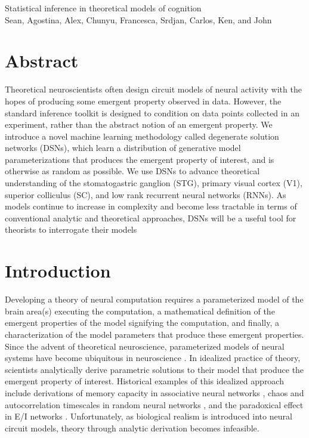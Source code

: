 \documentclass[11pt]{article}
\begin{document}
\medskip                        %

\thispagestyle{plain}
{\Large Statistical inference in theoretical models of cognition} \\
Sean, Agostina, Alex, Chunyu, Francesca, Srdjan, Carlos, Ken, and John
\section{Abstract}
Theoretical neuroscientists often design circuit models of neural activity with the hopes of producing some emergent property observed in data.  However, the standard inference toolkit is designed to condition on data points collected in an experiment, rather than the abstract notion of an emergent property.  We introduce a novel machine learning methodology called degenerate solution networks (DSNs), which learn a distribution of generative model parameterizations that produces the emergent property of interest, and is otherwise as random as possible.  We use DSNs to advance theoretical understanding of the stomatogastric ganglion (STG), primary visual cortex (V1), superior colliculus (SC), and low rank recurrent neural networks (RNNs).  As models continue to increase in complexity and become less tractable in terms of conventional analytic and theoretical approaches, DSNs will be a useful tool for theorists to interrogate their models

\section{Introduction}
Developing a theory of neural computation requires a parameterized model of the brain area(s) executing the computation,  a mathematical definition of the emergent properties of the model signifying the computation, and finally, a characterization of the model parameters that produce these emergent properties.  Since the advent of theoretical neuroscience, parameterized models of neural systems have become ubiquitous in neuroscience \cite{abbott2008theoretical}. In idealized practice of theory, scientists analytically derive parametric solutions to their model that produce the emergent property of interest.  Historical examples of this idealized approach include derivations of memory capacity in associative neural networks  \cite{hopfield1984neurons}, chaos and autocorrelation timescales in random neural networks \cite{sompolinsky1988chaos}, and the paradoxical effect in E/I networks \cite{tsodyks1997paradoxical}.  Unfortunately, as biological realism is introduced into neural circuit models, theory through analytic derivation becomes infeasible.
\end{document}
